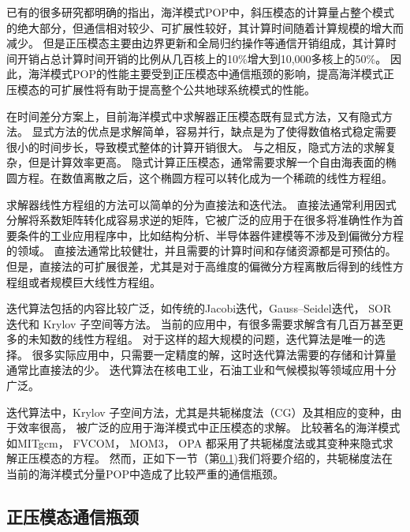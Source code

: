 已有的很多研究都明确的指出，海洋模式POP中，斜压模态的计算量占整个模式的绝大部分，但通信相对较少、可扩展性较好，其计算时间随着计算规模的增大而减少。
但是正压模态主要由边界更新和全局归约操作等通信开销组成，其计算时间开销占总计算时间开销的比例从几百核上的10\%增大到10,000多核上的50\%\cite{pop05,stone2011cgpop,Worley:2011:PCE:2063384.2063457, dennis2012computational}。
因此，海洋模式POP的性能主要受到正压模态中通信瓶颈的影响，提高海洋模式正压模态的可扩展性将有助于提高整个公共地球系统模式的性能。

在时间差分方案上，目前海洋模式中求解器正压模态既有显式方法，又有隐式方法\cite{griffies2000developments}。 
显式方法的优点是求解简单，容易并行，缺点是为了使得数值格式稳定需要很小的时间步长，导致模式整体的计算开销很大。
与之相反，隐式方法的求解复杂，但是计算效率更高。 
隐式计算正压模态，通常需要求解一个自由海表面的椭圆方程。在数值离散之后，这个椭圆方程可以转化成为一个稀疏的线性方程组。

 
求解器线性方程组的方法可以简单的分为直接法和迭代法。
直接法通常利用因式分解将系数矩阵转化成容易求逆的矩阵，它被广泛的应用于在很多将准确性作为首要条件的工业应用程序中，比如结构分析、半导体器件建模等不涉及到偏微分方程的领域\cite{benzi2002preconditioning}。
直接法通常比较健壮，并且需要的计算时间和存储资源都是可预估的。
但是，直接法的可扩展很差，尤其是对于高维度的偏微分方程离散后得到的线性方程组或者规模巨大线性方程组。 

迭代算法包括的内容比较广泛，如传统的Jacobi迭代，Gauss–Seidel迭代， SOR 迭代和 Krylov 子空间等方法\cite{saad2003iterative,barrett1994templates}。
当前的应用中，有很多需要求解含有几百万甚至更多的未知数的线性方程组。 对于这样的超大规模的问题，迭代算法是唯一的选择。
很多实际应用中，只需要一定精度的解，这时迭代算法需要的存储和计算量通常比直接法的少。 
迭代算法在核电工业，石油工业和气候模拟等领域应用十分广泛。

迭代算法中，Krylov 子空间方法，尤其是共轭梯度法（CG）及其相应的变种，由于效率很高，
被广泛的应用于海洋模式中正压模态的求解。
比较著名的海洋模式如MITgcm\citep{adcroft2014mitgcm}， FVCOM\citep{lai2010nonhydrostatic}， MOM3\citep{pacanowsky1999mom3}， OPA \citep{madec1997ocean}
都采用了共轭梯度法或其变种来隐式求解正压模态的方程。
然而，正如下一节（第\ref{related:bottleneck})我们将要介绍的，共轭梯度法在当前的海洋模式分量POP中造成了比较严重的通信瓶颈\citep{Worley:2011:PCE:2063384.2063457}。 

 

\subsection{正压模态通信瓶颈}
\label{related:bottleneck}


